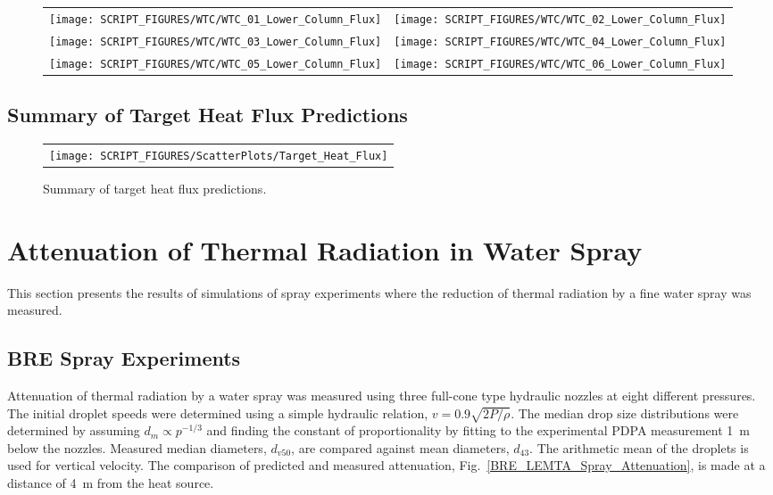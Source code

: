 \begin{figure}[p]
\begin{tabular*}{\textwidth}{l@{\extracolsep{\fill}}r}
\texttt{[image: SCRIPT\_FIGURES/WTC/WTC\_01\_Lower\_Column\_Flux]} &
\texttt{[image: SCRIPT\_FIGURES/WTC/WTC\_02\_Lower\_Column\_Flux]} \\
\texttt{[image: SCRIPT\_FIGURES/WTC/WTC\_03\_Lower\_Column\_Flux]} &
\texttt{[image: SCRIPT\_FIGURES/WTC/WTC\_04\_Lower\_Column\_Flux]} \\
\texttt{[image: SCRIPT\_FIGURES/WTC/WTC\_05\_Lower\_Column\_Flux]} &
\texttt{[image: SCRIPT\_FIGURES/WTC/WTC\_06\_Lower\_Column\_Flux]}
\end{tabular*}
\label{NIST_WTC_Lower_Column_Flux}
\end{figure}


\clearpage

\subsection{Summary of Target Heat Flux Predictions}

\begin{figure}[h!]
\begin{center}
\begin{tabular}{c}
\texttt{[image: SCRIPT\_FIGURES/ScatterPlots/Target\_Heat\_Flux]}
\end{tabular}
\end{center}
\caption[Summary of target heat flux predictions]
{Summary of target heat flux predictions.}
\end{figure}



\clearpage

\section{Attenuation of Thermal Radiation in Water Spray}

This section presents the results of simulations of spray experiments where the reduction of thermal radiation by a fine water spray was measured.

\subsection{BRE Spray Experiments}

Attenuation of thermal radiation by a water spray was measured using three full-cone type hydraulic nozzles at eight different pressures. The initial droplet speeds were determined using a simple hydraulic relation, $v = 0.9 \sqrt{2P/\rho}$. The median drop size distributions were determined by assuming $d_m \propto p^{-1/3}$ and finding the constant of proportionality by fitting to the experimental PDPA measurement 1~m below the nozzles.  Measured median diameters, $d_{v50}$, are compared against mean diameters, $d_{43}$. The arithmetic mean of the droplets is used for vertical velocity. The comparison of predicted and measured attenuation, Fig.~\ref{BRE_LEMTA_Spray_Attenuation}, is made at a distance of 4~m from the heat source.

